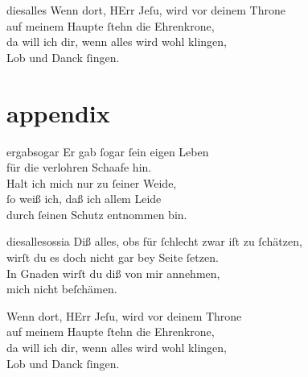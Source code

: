 \documentclass[tocstyle=ref-genre]{ees}
\begin{document}
{\begin{movement}{diesalles}
  Wenn dort, HErr Jeſu, wird vor deinem Throne\\
  auf meinem Haupte ſtehn die Ehrenkrone,\\
  da will ich dir, wenn alles wird wohl klingen,\\
  Lob und Danck ſingen.
\end{movement}

\clearpage
\part{appendix}

\begin{movement}{ergabsogar}
  Er gab ſogar ſein eigen Leben\\
  für die verlohren Schaafe hin.\\
  Halt ich mich nur zu ſeiner Weide,\\
  ſo weiß ich, daß ich allem Leide\\
  durch ſeinen Schutz entnommen bin.
\end{movement}

\begin{movement}{diesallesossia}
  \voice[Coro]
  Diß alles, obs für ſchlecht zwar iſt zu ſchätzen,\\
  wirſt du es doch nicht gar bey Seite ſetzen.\\
  In Gnaden wirſt du diß von mir annehmen,\\
  mich nicht beſchämen.

  Wenn dort, HErr Jeſu, wird vor deinem Throne\\
  auf meinem Haupte ſtehn die Ehrenkrone,\\
  da will ich dir, wenn alles wird wohl klingen,\\
  Lob und Danck ſingen.
\end{movement}
}

\eesScore
\end{document}
